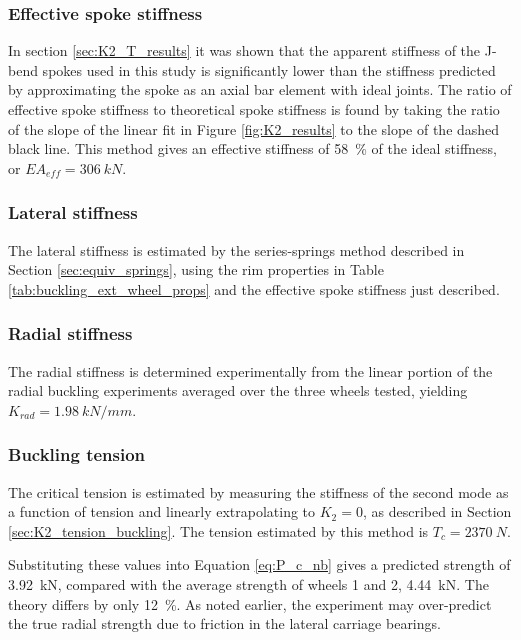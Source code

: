 \documentclass[\rootdir/thesis.tex]{subfiles}
\begin{document}
\subsubsection{Effective spoke stiffness}

In section \ref{sec:K2_T_results} it was shown that the apparent stiffness of the J-bend spokes used in this study is significantly lower than the stiffness predicted by approximating the spoke as an axial bar element with ideal joints. The ratio of effective spoke stiffness to theoretical spoke stiffness is found by taking the ratio of the slope of the linear fit in Figure \ref{fig:K2_results} to the slope of the dashed black line. This method gives an effective stiffness of \SI{58}{\percent} of the ideal stiffness, or $EA_{eff}=\SI{306}{kN}$.

\subsubsection{Lateral stiffness}

The lateral stiffness is estimated by the series-springs method described in Section \ref{sec:equiv_springs}, using the rim properties in Table \ref{tab:buckling_ext_wheel_props} and the effective spoke stiffness just described.

\subsubsection{Radial stiffness}

The radial stiffness is determined experimentally from the linear portion of the radial buckling experiments averaged over the three wheels tested, yielding $K_{rad}=\SI{1.98}{kN/mm}$.

\subsubsection{Buckling tension}

The critical tension is estimated by measuring the stiffness of the second mode as a function of tension and linearly extrapolating to $K_2=0$, as described in Section \ref{sec:K2_tension_buckling}. The tension estimated by this method is $T_c = \SI{2370}{N}$.

Substituting these values into Equation \eqref{eq:P_c_nb} gives a predicted strength of \SI{3.92}{kN}, compared with the average strength of wheels 1 and 2, \SI{4.44}{kN}. The theory differs by only \SI{12}{\percent}. As noted earlier, the experiment may over-predict the true radial strength due to friction in the lateral carriage bearings.
\end{document}
